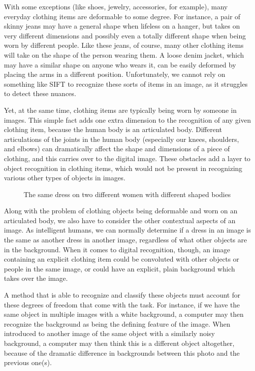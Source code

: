 \documentclass[12pt]{article} %
\begin{document}
	With some exceptions (like shoes, jewelry, accessories, for example), many everyday clothing items are deformable to some degree. For instance, a pair of skinny jeans may have a general shape when lifeless on a hanger, but takes on very different dimensions and possibly even a totally different shape when being worn by different people. Like these jeans, of course, many other clothing items will take on the shape of the person wearing them. A loose denim jacket, which may have a similar shape on anyone who wears it, can be easily deformed by placing the arms in a different position. Unfortunately, we cannot rely on something like SIFT\cite{lowe1999object} to recognize these sorts of items in an image, as it struggles to detect these nuances. 

	Yet, at the same time, clothing items are typically being worn by someone in images. This simple fact adds one extra dimension to the recognition of any given clothing item, because the human body is an articulated body. Different articulations of the joints in the human body (especially our knees, shoulders, and elbows) can dramatically affect the shape and dimensions of a piece of clothing, and this carries over to the digital image. These obstacles add a layer to object recognition in clothing items, which would not be present in recognizing various other types of objects in images.

\begin{figure}[h]
\caption{The same dress on two different women with different shaped bodies}\label{fig: 2}
\end{figure}

	Along with the problem of clothing objects being deformable and worn on an articulated body, we also have to consider the other contextual aspects of an image. As intelligent humans, we can normally determine if a dress in an image is the same as another dress in another image, regardless of what other objects are in the background. When it comes to digital recognition, though, an image containing an explicit clothing item could be convoluted with other objects or people in the same image, or could have an explicit, plain background which takes over the image.

	A method that is able to recognize and classify these objects must account for these degrees of freedom that come with the task. For instance, if we have the same object in multiple images with a white background, a computer may then recognize the background as being the defining feature of the image. When introduced to another image of the same object with a similarly noisy background, a computer may then think this is a different object altogether, because of the dramatic difference in backgrounds between this photo and the previous one(s). 
	
\end{document}
